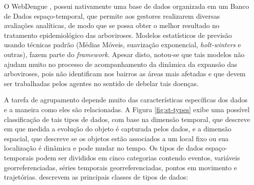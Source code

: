 \begin{figure}[!ht]
	\centering
\end{figure}

O WebDengue \cite{webdengue2011}, possui nativamente uma base de dados organizada em um Banco de Dados espaço-temporal, que permite aos gestores realizarem diversas avaliações analíticas, de modo que se possa obter o melhor resultado no tratamento epidemiológico das arboviroses. Modelos estatísticos de previsão usando técnicas padrão (Médias Móveis, suavização exponencial, \emph{holt-winters} e outras), fazem parte do \emph{framework}. Apesar disto, notou-se que tais modelos não ajudam muito no processo de acompanhamento da dinâmica da expansão das arboviroses, pois não identificam nos bairros as áreas mais afetadas e que devem ser trabalhadas pelos agentes no sentido de debelar tais doenças.

A tarefa de agrupamento depende muito das características específicas dos dados e a maneira como eles são relacionadas. A Figura \ref{fig:st-types} exibe uma possível classificação de tais tipos de dados, com base na dimensão temporal, que descreve em que medida a evolução do objeto é capturada pelos dados, e a dimensão espacial, que descreve se os objetos estão associados a um local fixo ou sua localização é dinâmica e pode mudar no tempo.
Os tipos de dados espaço-temporais podem ser divididos em cinco categorias contendo eventos, variáveis georreferenciadas, séries temporais georreferenciadas, pontos em movimento e trajetórias.  descrevem as principais classes de tipos de dados:

